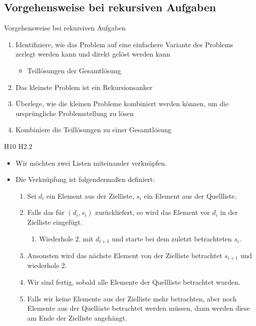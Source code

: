 \documentclass{../tuda-beamer}
\begin{document}
    \subsection{Vorgehensweise bei rekursiven Aufgaben}
    \label{subsec:recursion-approach}
    \begin{frame}[c]{Vorgehensweise bei rekursiven Aufgaben}
        \begin{enumerate}
            \item Identifiziere, wie das Problem auf eine einfachere Variante des Problems
            zerlegt werden kann und direkt gelöst werden kann

            \begin{itemize}
                \item Teillösungen der Gesamtlösung
            \end{itemize}
            \item Das kleinste Problem ist ein Rekursionsanker
            \item Überlege, wie die kleinen Probleme kombiniert werden können, um die
            ursprüngliche Problemstellung zu lösen
            \item Kombiniere die Teillösungen zu einer Gesamtlösung
        \end{enumerate}
    \end{frame}

    \begin{frame}[c]{H10 H2.2}
        \begin{itemize}
            \item Wir möchten zwei Listen miteinander verknüpfen.
            \item Die Verknüpfung ist folgendermaßen definiert:
            \begin{enumerate}
                \item Sei \(d_i\) ein Element aus der Zielliste, \(s_i\) ein Element aus der
                Quellliste.
                \item Falls das  für \((d_i, s_i)\) 
                zurückliefert, so wird das Element vor \(d_i\) in der Zielliste eingefügt.
                \begin{enumerate}
                    \item Wiederhole 2. mit \(d_{i + 1}\) und starte bei dem zuletzt
                    betrachteten \(s_i\).
                \end{enumerate}
                \item Ansonsten wird das nächste Element von der Zielliste betrachtet \(s_{i +
                1}\) und wiederhole 2.
                \item Wir sind fertig, sobald alle Elemente der Quellliste betrachtet wurden.
                \item Falls wir keine Elemente aus der Zielliste mehr betrachten, aber noch
                Elemente aus der Quelläste betrachtet werden müssen, dann werden diese am Ende
                der Zielliste angehängt.
            \end{enumerate}
        \end{itemize}
    \end{frame}
\end{document}
